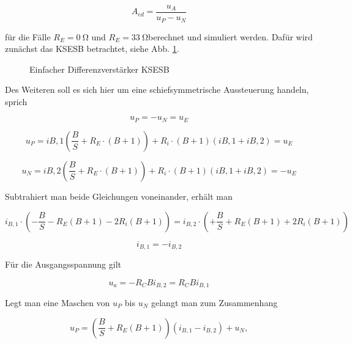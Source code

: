 \begin{equation}
    A_{ed} = \frac{u_A}{u_P - u_N}
\end{equation}

für die Fälle $R_E = \SI{0}{\ohm}$ und $R_E = \SI{33}{\ohm}$berechnet und simuliert werden. Dafür wird zunächst das KSESB betrachtet, siehe Abb. \ref{fig_Kap5_02:ESBDiffVerstKSBES}.

\begin{figure}[H]
	\centering
	\def\svgwidth{0.9\textwidth}
	
	\caption{Einfacher Differenzverstärker KSESB} 
	\label{fig_Kap5_02:ESBDiffVerstKSBES} 
\end{figure}

Des Weiteren soll es sich hier um eine schiefsymmetrische Aussteuerung handeln, sprich

\begin{equation}
    u_P = -u_N = u_E
\end{equation}

\begin{equation}
    \label{Gln_I}
    u_P = i{B,1} ( \frac{B}{S} + R_E\cdot (B + 1) ) + R_i \cdot (B+1)(i{B,1} + i{B,2}) = u_E
\end{equation}

\begin{equation}
    \label{Gln_II}
    u_N = i{B,2} ( \frac{B}{S} + R_E\cdot (B + 1) ) + R_i \cdot (B+1)(i{B,1} + i{B,2}) = -u_E
\end{equation}

Subtrahiert man beide Gleichungen voneinander, erhält man

\begin{equation}
    i_{B,1} \cdot \left( -\frac{B}{S} - R_E(B+1) - 2R_i(B+1) \right) = i_{B,2} \cdot \left( +\frac{B}{S} + R_E(B+1) + 2R_i(B+1) \right)
\end{equation}

\begin{equation}
    \label{current}
    i_{B,1} = -i_{B,2}
\end{equation}

Für die Ausgangsspannung gilt

\begin{equation}
    u_a = -R_C B i_{B,2} = R_C B i_{B,1}
\end{equation}

Legt man eine Maschen von $u_P$ bis $u_N$ gelangt man zum Zusammenhang

\begin{equation}
    u_P = \left( \frac{B}{S} + R_E(B+1) \right) (i_{B,1} - i_{B,2} ) + u_N, 
\end{equation}

